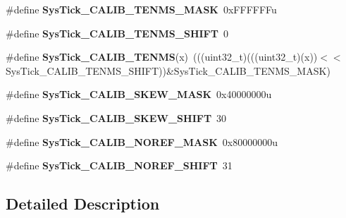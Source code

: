 \begin{DoxyCompactItemize}
\item 
\mbox{\label{group___sys_tick___register___masks_gac7496217678b52cce71dd785ed2b779b}} 
\#define {\bfseries Sys\+Tick\+\_\+\+C\+A\+L\+I\+B\+\_\+\+T\+E\+N\+M\+S\+\_\+\+M\+A\+SK}~0x\+F\+F\+F\+F\+F\+Fu
\item 
\mbox{\label{group___sys_tick___register___masks_gad2786b21e30185770874c88e29f22047}} 
\#define {\bfseries Sys\+Tick\+\_\+\+C\+A\+L\+I\+B\+\_\+\+T\+E\+N\+M\+S\+\_\+\+S\+H\+I\+FT}~0
\item 
\mbox{\label{group___sys_tick___register___masks_gaaacfe67f549e3e9fa76024d75d610754}} 
\#define {\bfseries Sys\+Tick\+\_\+\+C\+A\+L\+I\+B\+\_\+\+T\+E\+N\+MS}(x)~(((uint32\+\_\+t)(((uint32\+\_\+t)(x))$<$$<$Sys\+Tick\+\_\+\+C\+A\+L\+I\+B\+\_\+\+T\+E\+N\+M\+S\+\_\+\+S\+H\+I\+FT))\&Sys\+Tick\+\_\+\+C\+A\+L\+I\+B\+\_\+\+T\+E\+N\+M\+S\+\_\+\+M\+A\+SK)
\item 
\mbox{\label{group___sys_tick___register___masks_gaade570cf5b9c0a8da6e1215de8db8d82}} 
\#define {\bfseries Sys\+Tick\+\_\+\+C\+A\+L\+I\+B\+\_\+\+S\+K\+E\+W\+\_\+\+M\+A\+SK}~0x40000000u
\item 
\mbox{\label{group___sys_tick___register___masks_ga12bc3aae96690bf88f38e0bf46aa3d8b}} 
\#define {\bfseries Sys\+Tick\+\_\+\+C\+A\+L\+I\+B\+\_\+\+S\+K\+E\+W\+\_\+\+S\+H\+I\+FT}~30
\item 
\mbox{\label{group___sys_tick___register___masks_gabca0ac6719f78220d81d2fc1328d5a45}} 
\#define {\bfseries Sys\+Tick\+\_\+\+C\+A\+L\+I\+B\+\_\+\+N\+O\+R\+E\+F\+\_\+\+M\+A\+SK}~0x80000000u
\item 
\mbox{\label{group___sys_tick___register___masks_ga957057ddf04b20227820b1343b08a302}} 
\#define {\bfseries Sys\+Tick\+\_\+\+C\+A\+L\+I\+B\+\_\+\+N\+O\+R\+E\+F\+\_\+\+S\+H\+I\+FT}~31
\end{DoxyCompactItemize}


\subsection{Detailed Description}

